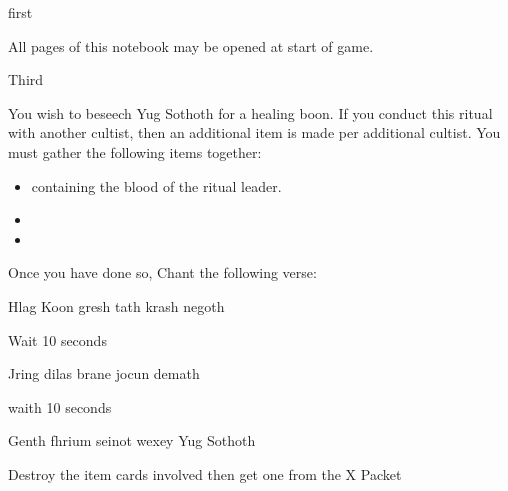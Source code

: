 \documentclass[greennotebook]{guildcamp4} %
\begin{document}
\startnotebook{\nRasputinYog{}}

\begin{page}{first}
	
	All pages of this notebook may be opened at start of game.
	
\end{page}

\begin{page}{Third}
		
		You wish to beseech Yug Sothoth for a healing boon. If you conduct this ritual with another cultist, then an additional item is made per additional cultist. You must gather the following items together: 
		
		\begin{itemize}
			\item \iTestTube{} containing the blood of the ritual leader.
			\item \iSieve{}
			\item \iCauldron{}
		\end{itemize}
	
		Once you have done so, Chant the following verse:
		
		Hlag Koon gresh tath krash negoth
		
		Wait 10 seconds
		
		Jring dilas brane jocun demath
		
		waith 10 seconds
		
		Genth fhrium seinot wexey Yug Sothoth
		
		Destroy the item cards involved then get one \iHealthPotion{} from the X Packet 

	\end{page}
	
\end{document}
